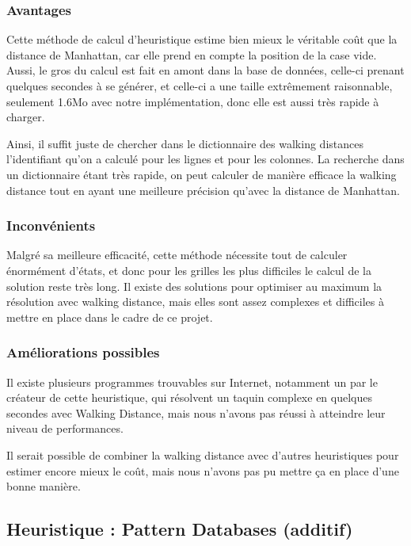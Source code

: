 \documentclass[a4paper, 12pt]{article}
\begin{document}
\subsubsection{Avantages}

Cette méthode de calcul d'heuristique estime bien mieux le véritable coût que la distance de Manhattan, car elle prend en compte la position de la case vide. Aussi, le gros du calcul est fait en amont dans la base de données, celle-ci prenant quelques secondes à se générer, et celle-ci a une taille extrêmement raisonnable, seulement 1.6Mo avec notre implémentation, donc elle est aussi très rapide à charger.

Ainsi, il suffit juste de chercher dans le dictionnaire des walking distances l'identifiant qu'on a calculé pour les lignes et pour les colonnes.
La recherche dans un dictionnaire étant très rapide, on peut calculer de manière efficace la walking distance tout en ayant une meilleure précision qu'avec la distance de Manhattan.

\subsubsection{Inconvénients}

Malgré sa meilleure efficacité, cette méthode nécessite tout de calculer énormément d'états, et donc pour les grilles les plus difficiles le calcul de la solution reste très long.
Il existe des solutions pour optimiser au maximum la résolution avec walking distance, mais elles sont assez complexes et difficiles à mettre en place dans le cadre de ce projet.

\subsubsection{Améliorations possibles}

Il existe plusieurs programmes trouvables sur Internet, notamment un par le créateur de cette heuristique, qui résolvent un taquin complexe en quelques secondes avec Walking Distance, mais nous n'avons pas réussi à atteindre leur niveau de performances.

Il serait possible de combiner la walking distance avec d'autres heuristiques pour estimer encore mieux le coût, mais nous n'avons pas pu mettre ça en place d'une bonne manière.

\subsection{Heuristique : Pattern Databases (additif)}
\end{document}
